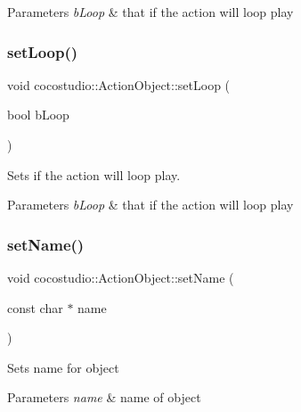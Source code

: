 \begin{DoxyParams}{Parameters}
{\em b\+Loop} & that if the action will loop play \\
\hline
\end{DoxyParams}
\mbox{\label{classcocostudio_1_1ActionObject_a188046afbabf20869af3aaef2762e4e2}} 
\subsubsection{\texorpdfstring{set\+Loop()}{setLoop()}\hspace{0.1cm}{\footnotesize\ttfamily [2/2]}}
{\footnotesize\ttfamily void cocostudio\+::\+Action\+Object\+::set\+Loop (\begin{DoxyParamCaption}\item[{bool}]{b\+Loop }\end{DoxyParamCaption})}

Sets if the action will loop play.


\begin{DoxyParams}{Parameters}
{\em b\+Loop} & that if the action will loop play \\
\hline
\end{DoxyParams}
\mbox{\label{classcocostudio_1_1ActionObject_a49c04b9506ebdc6dbb96d01d461140f5}} 
\subsubsection{\texorpdfstring{set\+Name()}{setName()}\hspace{0.1cm}{\footnotesize\ttfamily [1/2]}}
{\footnotesize\ttfamily void cocostudio\+::\+Action\+Object\+::set\+Name (\begin{DoxyParamCaption}\item[{const char $\ast$}]{name }\end{DoxyParamCaption})}

Sets name for object


\begin{DoxyParams}{Parameters}
{\em name} & name of object \\
\hline
\end{DoxyParams}
\mbox{\label{classcocostudio_1_1ActionObject_a49c04b9506ebdc6dbb96d01d461140f5}} 
